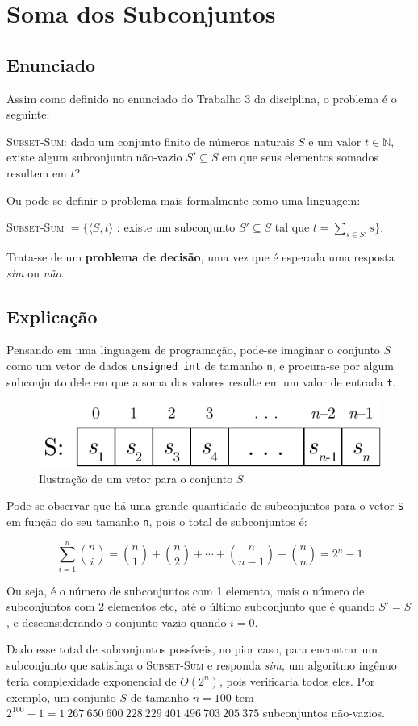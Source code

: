 \section{Soma dos Subconjuntos}

\subsection{Enunciado}

Assim como definido no enunciado do Trabalho 3 da disciplina, o problema é o seguinte:

\textsc{Subset-Sum}: dado um conjunto finito de números naturais $S$ e um valor $t \in \mathbb{N}$, existe algum subconjunto não-vazio $S' \subseteq S$ em que seus elementos somados resultem em $t$?

Ou pode-se definir o problema mais formalmente como uma linguagem:

\textsc{Subset-Sum} $= \{ \langle S, t \rangle$ : existe um subconjunto $S' \subseteq S$ tal que $t = \sum_{s \in S'}s \}$.

Trata-se de um \textbf{problema de decisão}, uma vez que é esperada uma resposta \textit{sim} ou \textit{não}.

\subsection{Explicação}

Pensando em uma linguagem de programação, pode-se imaginar o conjunto $S$ como um vetor de dados \texttt{unsigned int} de tamanho \texttt{n}, e procura-se por algum subconjunto dele em que a soma dos valores resulte em um valor de entrada \texttt{t}.

\begin{figure}[h]
	\centering
	\includegraphics[scale=0.9]{./input/vetor.pdf}
	\caption{Ilustração de um vetor para o conjunto $S$. \label{fig:vetor}}
\end{figure}

Pode-se observar que há uma grande quantidade de subconjuntos para o vetor \texttt{S} em função do seu tamanho \texttt{n}, pois o total de subconjuntos é:

$$
	\sum_{i=1}^{n} {n \choose i} = {n \choose 1} + {n \choose 2} + \cdots + {n \choose n-1} + {n \choose n} = 2^n - 1
$$

Ou seja, é o número de subconjuntos com 1 elemento, mais o número de subconjuntos com 2 elementos etc, até o último subconjunto que é quando $S' = S$, e desconsiderando o conjunto vazio quando $i = 0$.

Dado esse total de subconjuntos possíveis, no pior caso, para encontrar um subconjunto que satisfaça o \textsc{Subset-Sum} e responda \textit{sim}, um algoritmo ingênuo teria complexidade exponencial de $O(2^n)$, pois verificaria todos eles. Por exemplo, um conjunto $S$ de tamanho $n = 100$ tem $2^{100} - 1 = 1\ 267\ 650\ 600\ 228\ 229\ 401\ 496\ 703\ 205\ 375$ subconjuntos não-vazios.

